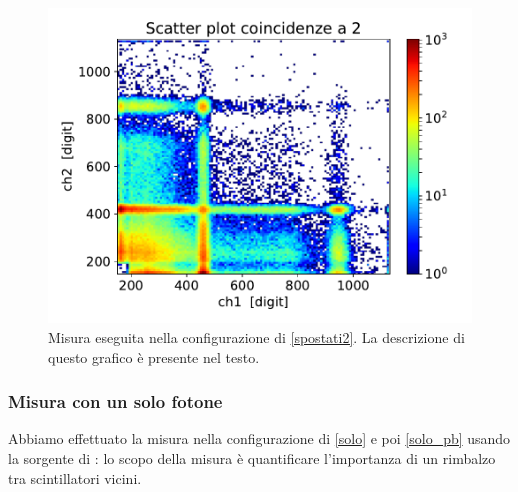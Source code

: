 \begin{figure}[h]
\centering
\includegraphics[width=\textwidth]{immagini/0518_piombo}
\caption{Misura eseguita nella configurazione di \autoref{spostati2}. La descrizione di questo grafico è presente nel testo.}
\label{piombo}
\end{figure}


\subsubsection{Misura con un solo fotone}

Abbiamo effettuato la misura nella configurazione di \autoref{solo} e poi \autoref{solo_pb} usando la sorgente di \cs{}: lo scopo della misura è quantificare l'importanza di un rimbalzo tra scintillatori vicini.

 
